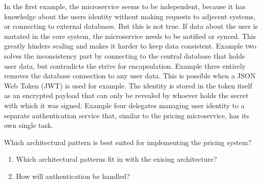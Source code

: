 In the first example, the microservice seems to be independent, because it has knowledge about the users identity without making requests to adjecent systems, or connecting to external databases. But this is not true. If data about the user is mutated in the core system, the microservice needs to be notified or synced. This greatly hinders scaling and makes it harder to keep data consistent. Example two solves the inconsistency part by connecting to the central database that holds user data, but contradicts the strive for encapsulation. Example three entirely removes the database connection to any user data. This is possible when a JSON Web Token (JWT) is used for example. The identity is stored in the token itself as an encrypted payload that can only be revealed by whoever holds the secret with which it was signed. Example four delegates managing user identity to a separate authentication service that, similar to the pricing microservice, has its own single task.


Which architectural pattern is best suited for implementing the pricing system?
\begin{enumerate}
	\item Which architectural patterns fit in with the exising architecture?
	\item How will authentication be handled?
\end{enumerate}
